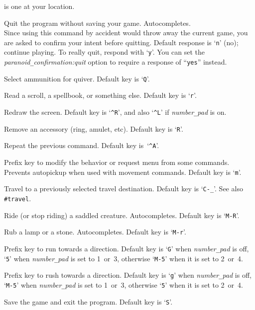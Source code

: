 is one at your location.
\item[\tb{\#quit}]
Quit the program without saving your game. Autocompletes.\\
Since using this command by accident would throw away the current game,
you are asked to confirm your intent before quitting.
Default response is `{\tt n}' (no); continue playing.
To really quit, respond with `{\tt y}'.
You can set the
{\it paranoid\verb+_+confirmation:quit\/}
option to require a response of ``{\tt yes}'' instead.
\item[\tb{\#quiver}]
Select ammunition for quiver. Default key is `{\tt Q}'.
\item[\tb{\#read}]
Read a scroll, a spellbook, or something else. Default key is `{\tt r}'.
\item[\tb{\#redraw}]
Redraw the screen.
Default key is `{\tt \^{}R}',
and also `{\tt \^{}L}' if {\it number\verb+_+pad\/} is on.
\item[\tb{\#remove}]
Remove an accessory (ring, amulet, etc). Default key is `{\tt R}'.
\item[{\tb{\#repeat}}]
Repeat the previous command.
Default key is~`{\tt \^{}A}'.
\item[\tb{\#reqmenu}]
Prefix key to modify the behavior or request menu from some commands.
Prevents autopickup when used with movement commands.
Default key is `{\tt m}'.
\item[\tb{\#retravel}]
Travel to a previously selected travel destination.
Default key is `{\tt C-\verb+_+}'.
See also {\tt \#travel}.
\item[\tb{\#ride}]
Ride (or stop riding) a saddled creature. Autocompletes.
Default key is `{\tt M-R}'.
\item[\tb{\#rub}]
Rub a lamp or a stone. Autocompletes. Default key is `{\tt M-r}'.
\item[\tb{\#run}]
Prefix key to run towards a direction.
Default key is `{\tt G}' when
{\it number\verb+_+pad\/}
is off,
`{\tt 5}' when
{\it number\verb+_+pad\/}
is set to 1~or~3,
otherwise `{\tt M-5}' when it is set to 2~or~4.
\item[\tb{\#rush}]
Prefix key to rush towards a direction.
Default key is `{\tt g}' when
{\it number\verb+_+pad\/}
is off,
`{\tt M-5}' when
{\it number\verb+_+pad\/}
is set to 1~or~3,
otherwise `{\tt 5}' when it is set to 2~or~4.
\item[\tb{\#save}]
Save the game and exit the program.
Default key is `{\tt S}'.
\item[\tb{\#saveoptions}]
